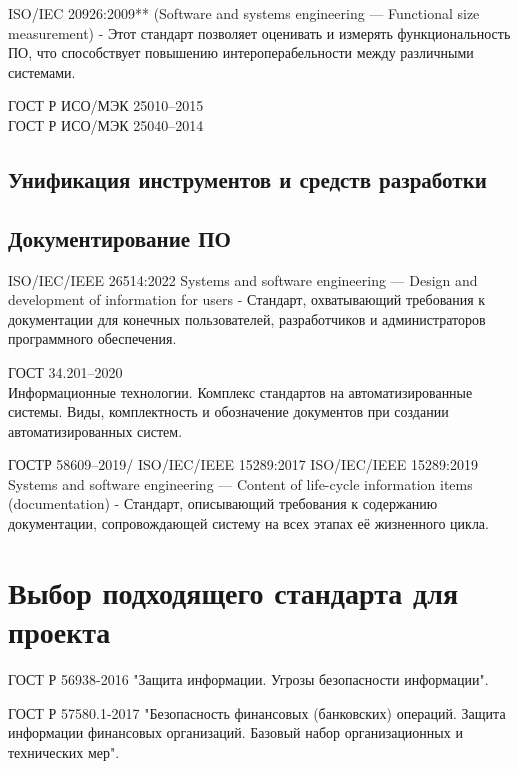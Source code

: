 ISO/IEC 20926:2009** (Software and systems engineering — Functional size measurement)
     - Этот стандарт позволяет оценивать и измерять функциональность ПО, что способствует повышению интероперабельности между различными системами.

ГОСТ Р ИСО/МЭК 25010--2015\\
ГОСТ Р ИСО/МЭК 25040--2014\\

\subsection{Унификация инструментов и средств разработки}


\subsection{Документирование ПО}

ISO/IEC/IEEE 26514:2022
Systems and software engineering — Design and development of information for users
     - Стандарт, охватывающий требования к документации для конечных пользователей, разработчиков и администраторов программного обеспечения.

ГОСТ 34.201--2020\\
Информационные технологии.
Комплекс стандартов на автоматизированные системы.
Виды, комплектность и обозначение документов
при создании автоматизированных систем.


ГОСТР 58609--2019/ ISO/IEC/IEEE 15289:2017
ISO/IEC/IEEE 15289:2019
Systems and software engineering — Content of life-cycle information items (documentation)
     - Стандарт, описывающий требования к содержанию документации, сопровождающей систему на всех этапах её жизненного цикла.


\section{Выбор подходящего стандарта для проекта}

\break

ГОСТ Р 56938-2016 "Защита информации. Угрозы безопасности информации".

ГОСТ Р 57580.1-2017 "Безопасность финансовых (банковских) операций. Защита информации финансовых организаций. Базовый набор организационных и технических мер".

